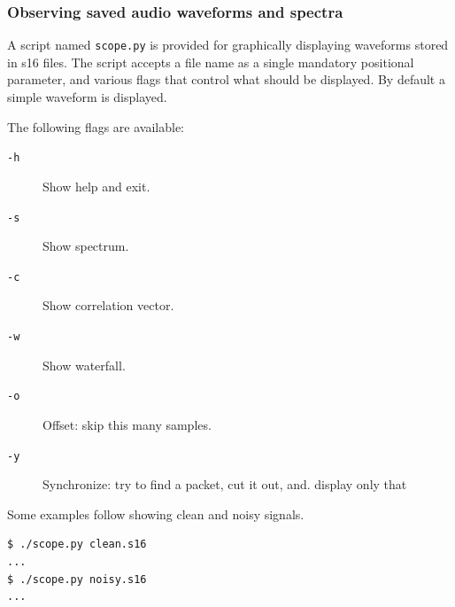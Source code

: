 \documentclass[a4paper]{article}
\begin{document}
\subsubsection{Observing saved audio waveforms and spectra}

A script named \texttt{scope.py} is provided for graphically displaying 
waveforms stored in s16 files. The script accepts a file name as a 
single mandatory positional parameter, and various flags that control 
what should be displayed. By default a simple waveform is displayed.

The following flags are available:

\begin{description}
\item[\texttt{-h}] Show help and exit.
\item[\texttt{-s}] Show spectrum.
\item[\texttt{-c}] Show correlation vector.
\item[\texttt{-w}] Show waterfall.
\item[\texttt{-o}] Offset: skip this many samples.
\item[\texttt{-y}] Synchronize: try to find a packet, cut it out, and.
  display only that
\end{description}

Some examples follow showing clean and noisy signals.

\begin{lstlisting}
$ ./scope.py clean.s16
...
$ ./scope.py noisy.s16
...
\end{lstlisting}
\end{document}
